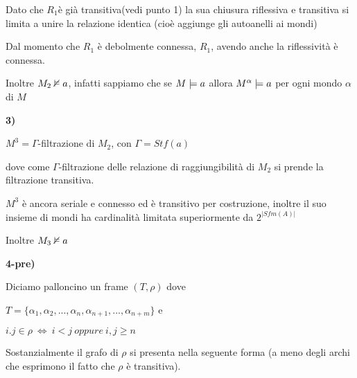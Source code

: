 Dato che $R_{1}$è già transitiva(vedi punto 1) la sua chiusura riflessiva
e transitiva si limita a unire la relazione identica (cioè aggiunge
gli autoanelli ai mondi)

Dal momento che $R_{1}$ è debolmente connessa, $R_{1}$, avendo anche
la riflessività è connessa.

Inoltre $M_{2}\nvDash a$, infatti sappiamo che se $M\models a$ allora
$M^{\alpha}\models a$ per ogni mondo $\alpha$ di $M$

\textbf{3)}

$M^{3}=$$\Gamma$-filtrazione di $M_{2}$, con $\Gamma=Stf(a)$

dove come $\Gamma$-filtrazione delle relazione di raggiungibilità
di $M_{2}$ si prende la filtrazione transitiva. 

$M^{3}$ è ancora seriale e connesso ed è transitivo per costruzione,
inoltre il suo insieme di mondi ha cardinalità limitata superiormente
da $2^{|Sfm(A)|}$

Inoltre $M_{3}\nvDash a$

\textbf{4-pre)}

Diciamo palloncino un frame $(T,\rho)$ dove 

$T=\{\alpha_{1},\alpha_{2},...,\alpha_{n},\alpha_{n+1},...,\alpha_{n+m}\}$
e 

$i.j\in\rho\ \iff\ i<j\ oppure\ i,j\geq n$ 

Sostanzialmente il grafo di $\rho$ si presenta nella seguente forma
(a meno degli archi che esprimono il fatto che $\rho$ è transitiva).\\



